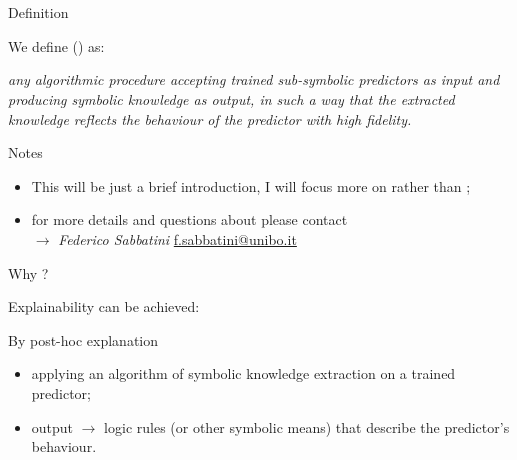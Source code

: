 \documentclass[presentation]{beamer}\mode<presentation>{\usetheme{AMSBolognaFC}}
\begin{document}
\section{\longske}


\begin{frame}[c]{Definition}
    \begin{block}{We define \longske{} (\ske) as:}
        \begin{displayquote}\itshape
            any \emph{algorithmic} procedure accepting \emph{trained} \alert{sub-symbolic predictors} as input and producing \alert{symbolic knowledge} as output, in such a way that the extracted knowledge \emph{reflects} the behaviour of the predictor with high fidelity.
        \end{displayquote}
    \end{block}
    \begin{block}{Notes}
        \begin{itemize}
            \item This will be just a brief introduction, I will focus more on \longski{} rather than \longske;
            \item for more details and questions about \ske{} please contact\\$\rightarrow$ \emph{Federico Sabbatini} \href{mailto:f.sabbatini@unibo.it}{f.sabbatini@unibo.it}
        \end{itemize}
    \end{block}
    
\end{frame}


\begin{frame}[c]{Why \ske?}
    
    Explainability  can be achieved:
    \begin{block}{By post-hoc explanation}
        \begin{itemize}
            \item applying an algorithm of symbolic knowledge extraction on a trained predictor;
            \item output $\rightarrow$ logic rules (or other symbolic means) that describe the predictor's behaviour.
        \end{itemize}    
    \end{block}
    
\end{frame}
\end{document}
